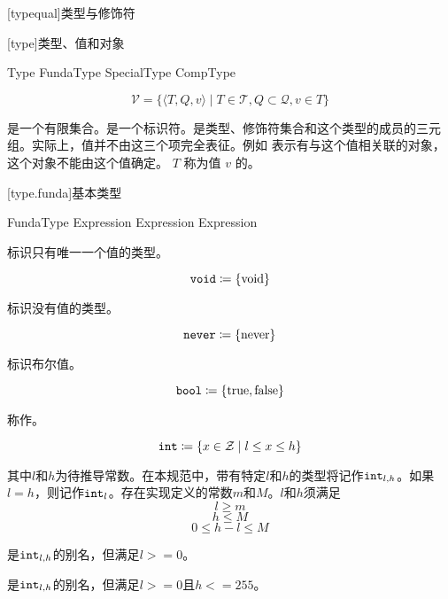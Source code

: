 
[typequal]{类型与修饰符}

[type]{类型、值和对象}

\begin{bnf}{Type}
    FundaType \br
    SpecialType \br
    CompType
\end{bnf}

$$ \mathcal{V} = \{ \langle T, Q, v \rangle \mid T \in \mathcal{T}, Q \subset \mathcal{Q}, v \in T \} $$

\pnum
{}是一个有限集合。是一个标识符。是类型、修饰符集合和这个类型的成员的三元组。\enternote 实际上，值并不由这三个项完全表征。例如  表示有与这个值相关联的对象，这个对象不能由这个值确定。 \exitnote $T$ 称为值 $v$ 的。

[type.funda]{基本类型}

\begin{bnf}{FundaType}
     \br
     \br
     \br
     \br
     \br
     \terminal{<} Expression \terminal{,} Expression \terminal{>} \br
     \br
     \terminal{<} Expression \terminal{>} \br
\end{bnf}

\pnum
{}标识只有唯一一个值的类型。

$$\texttt{void} \coloneqq \{ \mathrm{void} \}$$

\pnum
{}标识没有值的类型。

$$\texttt{never} \coloneqq \{ \mathrm{never} \}$$

\pnum
{} 标识布尔值。

$$\texttt{bool} \coloneqq \{ \mathrm{true}, \mathrm{false} \}$$

\pnum
{} 称作。

$$\texttt{int} \coloneqq \{ x \in \mathcal{Z} \mid l \le x \le h \} $$

其中$l$和$h$为待推导常数。在本规范中，带有特定$l$和$h$的类型将记作$\texttt{int}_{l, h}$。如果$l = h$，则记作$\texttt{int}_l$。存在实现定义的常数$m$和$M$。$l$和$h$须满足
$$ l \ge m $$
$$ h \le M $$
$$ 0 \le h - l \le M $$

是$\texttt{int}_{l,h}$的别名，但满足$l>=0$。

是$\texttt{int}_{l,h}$的别名，但满足$l>=0$且$h<=255$。

